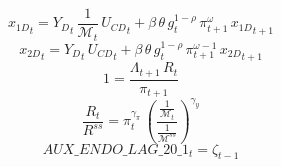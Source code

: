 \documentclass[10pt,a4paper]{article}
\begin{document}
\begin{dmath}
{x_{1D}}_{t}={Y_D}_{t}\, \frac{1}{\mathcal{M}_{t}}\, {U_{CD}}_{t}+\beta\, {\theta}\, {g}_{t}^{1-\rho}\, {\pi}_{t+1}^{{\omega}}\, {x_{1D}}_{t+1}
\end{dmath}
\begin{dmath}
{x_{2D}}_{t}={Y_D}_{t}\, {U_{CD}}_{t}+\beta\, {\theta}\, {g}_{t}^{1-\rho}\, {\pi}_{t+1}^{{\omega}-1}\, {x_{2D}}_{t+1}
\end{dmath}
\begin{dmath}
1=\frac{{\Lambda}_{t+1}\, {R}_{t}}{{\pi}_{t+1}}
\end{dmath}
\begin{dmath}
\frac{{R}_{t}}{{R^{ss}}}={\pi}_{t}^{{{\gamma}_{\pi}}}\, \left(\frac{\frac{1}{\mathcal{M}_{t}}}{\frac{1}{{\mathcal{M}^{ss}}}}\right)^{{{\gamma}_{y}}}
\end{dmath}
\begin{dmath}
AUX\_ENDO\_LAG\_20\_1_{t}={\zeta}_{t-1}
\end{dmath}
\end{document}
